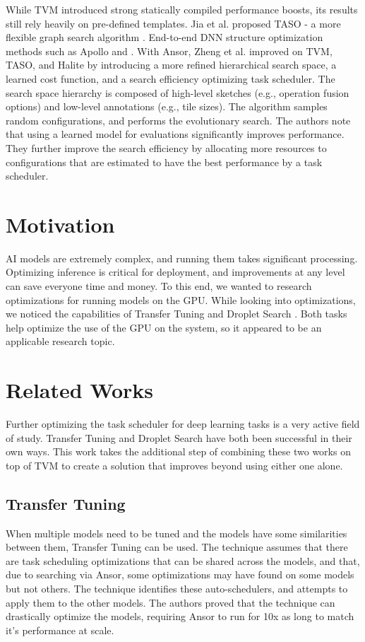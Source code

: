 \documentclass[conference]{IEEEtran}
\begin{document}
While TVM introduced strong statically compiled performance boosts, its results still rely heavily on pre-defined templates. Jia et al. proposed TASO - a more flexible graph search algorithm \cite{Jia_etal_taso_2019}. End-to-end DNN structure optimization methods such as Apollo and . With Ansor, Zheng et al. \cite{zheng_ansor_2023} improved on TVM, TASO, and Halite by introducing a more refined hierarchical search space, a learned cost function, and a search efficiency optimizing task scheduler. The search space hierarchy is composed of high-level sketches (e.g., operation fusion options) and low-level annotations (e.g., tile sizes). The algorithm samples random configurations, and performs the evolutionary search. The authors note that using a learned model for evaluations significantly improves performance. They further improve the search efficiency by allocating more resources to configurations that are estimated to have the best performance by a task scheduler.

\section{Motivation}
AI models are extremely complex, and running them takes significant processing. Optimizing inference is critical for deployment, and improvements at any level can save everyone time and money. To this end, we wanted to research optimizations for running models on the GPU. While looking into optimizations, we noticed the capabilities of Transfer Tuning \cite{gibson_transfer-tuning_2022} and Droplet Search \cite{canesche_droplet_2024, canesche_explore_2024}. Both tasks help optimize the use of the GPU on the system, so it appeared to be an applicable research topic.

\section{Related Works}
Further optimizing the task scheduler for deep learning tasks is a very active field of study. Transfer Tuning and Droplet Search have both been successful in their own ways. This work takes the additional step of combining these two works on top of TVM to create a solution that improves beyond using either one alone.

\subsection{Transfer Tuning}
When multiple models need to be tuned and the models have some similarities between them, Transfer Tuning can be used. The technique assumes that there are task scheduling optimizations that can be shared across the models, and that, due to searching via Ansor, some optimizations may have found on some models but not others. The technique identifies these auto-schedulers, and attempts to apply them to the other models. The authors proved that the technique can drastically optimize the models, requiring Ansor to run for 10x as long to match it's performance at scale.
\end{document}
